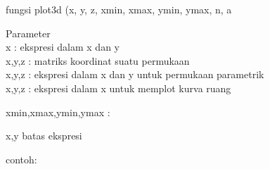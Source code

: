 \documentclass{article}
\begin{document}
\begin{eulernotebook}
\begin{eulercomment}
\begin{eulercomment}
\begin{eulercomment}
fungsi plot3d (x, y, z, xmin, xmax, ymin, ymax, n, a

Parameter\\
x : ekspresi dalam x dan y\\
x,y,z : matriks koordinat suatu permukaan\\
x,y,z : ekspresi dalam x dan y untuk permukaan parametrik\\
x,y,z : ekspresi dalam x untuk memplot kurva ruang

xmin,xmax,ymin,ymax :\\
\end{eulercomment}
\begin{eulerttcomment}
  x,y batas ekspresi
\end{eulerttcomment}
\begin{eulercomment}

contoh:


\end{eulercomment}
\end{eulercomment}
\end{eulercomment}
\end{eulernotebook}
\end{document}
